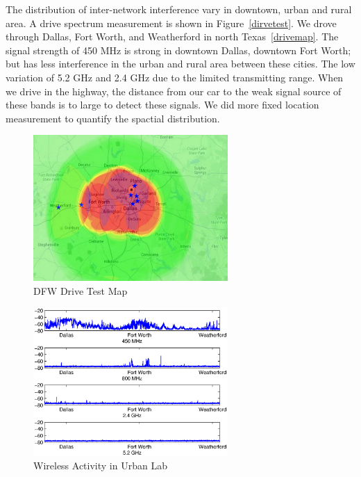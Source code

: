 The distribution of inter-network interference vary in downtown, urban and rural
area. A drive spectrum measurement is shown in Figure~\ref{dirvetest}.
We drove through Dallas, Fort Worth, and Weatherford in north Texas~\ref{drivemap}.
The signal strength of 450 MHz is strong in downtown Dallas, downtown Fort Worth;
but has less interference in the urban and rural area between these cities.
The low variation of 5.2 GHz and 2.4 GHz due to the limited transmitting range.
When we drive in the highway, the distance from our car to the weak signal source of these bands
is to large to detect these signals. We did more fixed location measurement to quantify
the spactial distribution. 
   \begin{figure}
   \centering
   \includegraphics[width=74mm]{figures/drivemap}
   \vspace{-0.1in}
   \caption{DFW Drive Test Map}                                                                 
   \label{fig:labact}
   \end{figure}
   \begin{figure}
   \centering
   \includegraphics[width=74mm]{figures/drivetest}
   \vspace{-0.1in}
   \caption{Wireless Activity in Urban Lab}                                                                 
   \label{fig:labact}
   \end{figure}

